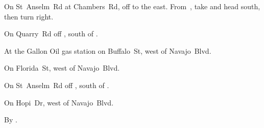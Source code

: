 
\begin{LocationList}

On St~Anselm~Rd at Chambers~Rd, off  to the east.
From~, take  and head south, then turn right.

On Quarry~Rd off , south of  .

At the Gallon Oil gas station on Buffalo~St, west of   Navajo~Blvd.

On Florida~St, west of   Navajo~Blvd.

On St~Anselm~Rd off , south of  .

On Hopi~Dr, west of   Navajo~Blvd.

\Location{\TruckStop \Gas \Rest}
By  .

\end{LocationList}
